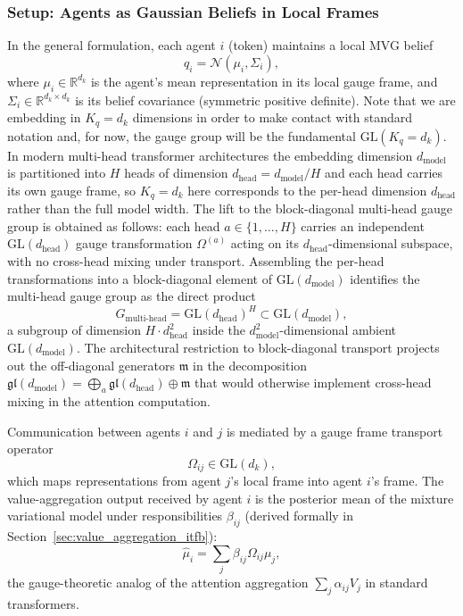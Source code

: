 \documentclass[11pt]{article}
\begin{document}
\subsubsection{Setup: Agents as Gaussian Beliefs in Local Frames}

In the general formulation, each agent $i$ (token) maintains a local MVG belief
\begin{equation}
q_i = \mathcal{N}(\mu_i, \Sigma_i),
\end{equation}
where $\mu_i \in \mathbb{R}^{d_k}$ is the agent's mean representation in its local gauge frame, and $\Sigma_i \in \mathbb{R}^{d_k\times d_k}$ is its belief covariance (symmetric positive definite). Note that we are embedding in $K_q=d_k$ dimensions in order to make contact with standard notation and, for now, the gauge group will be the fundamental $\mathrm{GL}(K_q=d_k)$. In modern multi-head transformer architectures the embedding dimension $d_{\text{model}}$ is partitioned into $H$ heads of dimension $d_{\text{head}} = d_{\text{model}}/H$ and each head carries its own gauge frame, so $K_q=d_k$ here corresponds to the per-head dimension $d_{\text{head}}$ rather than the full model width. The lift to the block-diagonal multi-head gauge group is obtained as follows: each head $a \in \{1,\ldots,H\}$ carries an independent $\mathrm{GL}(d_{\text{head}})$ gauge transformation $\Omega^{(a)}$ acting on its $d_{\text{head}}$-dimensional subspace, with no cross-head mixing under transport. Assembling the per-head transformations into a block-diagonal element of $\mathrm{GL}(d_{\text{model}})$ identifies the multi-head gauge group as the direct product
\begin{equation}
G_{\text{multi-head}} = \mathrm{GL}(d_{\text{head}})^H \subset \mathrm{GL}(d_{\text{model}}),
\label{eq:multihead_gauge_group}
\end{equation}
a subgroup of dimension $H \cdot d_{\text{head}}^2$ inside the $d_{\text{model}}^2$-dimensional ambient $\mathrm{GL}(d_{\text{model}})$. The architectural restriction to block-diagonal transport projects out the off-diagonal generators $\mathfrak{m}$ in the decomposition $\mathfrak{gl}(d_{\text{model}}) = \bigoplus_a \mathfrak{gl}(d_{\text{head}}) \oplus \mathfrak{m}$ that would otherwise implement cross-head mixing in the attention computation.

Communication between agents $i$ and $j$ is mediated by a gauge frame transport operator
\begin{equation}
\Omega_{ij} \in \mathrm{GL}(d_k),
\end{equation}
which maps representations from agent $j$'s local frame into agent $i$'s frame. The value-aggregation output received by agent $i$ is the posterior mean of the mixture variational model under responsibilities $\beta_{ij}$ (derived formally in Section~\ref{sec:value_aggregation_itfb}):
\begin{equation}
\hat\mu_i = \sum_j \beta_{ij} \Omega_{ij}\mu_j,
\end{equation}
the gauge-theoretic analog of the attention aggregation $\sum_j \alpha_{ij} V_j$ in standard transformers.
\end{document}
